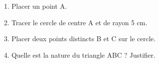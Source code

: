 \documentclass[exercice]{thedocument}%
\begin{document}
%
\begin{enumerate}
    \item Placer un point A.
    \item Tracer le cercle de centre A et de rayon 5 cm.
    \item Placer deux points distincts B et C sur le cercle.
    \item Quelle est la nature du triangle ABC ? Justifier.
\end{enumerate}
\end{document}
